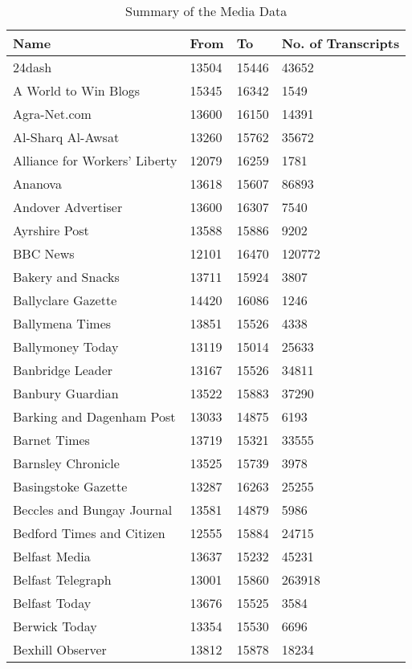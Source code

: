 \begingroup\tiny
\begin{longtable}{p{}p{}p{}p{}}
\caption{Summary of the Media Data} \\ 
  \hline
Name & From & To & No. of Transcripts \\ 
  \hline
24dash & 13504 & 15446 & 43652 \\ 
  A World to Win Blogs & 15345 & 16342 & 1549 \\ 
  Agra-Net.com & 13600 & 16150 & 14391 \\ 
  Al-Sharq Al-Awsat & 13260 & 15762 & 35672 \\ 
  Alliance for Workers' Liberty & 12079 & 16259 & 1781 \\ 
  Ananova & 13618 & 15607 & 86893 \\ 
  Andover Advertiser & 13600 & 16307 & 7540 \\ 
  Ayrshire Post & 13588 & 15886 & 9202 \\ 
  BBC News & 12101 & 16470 & 120772 \\ 
  Bakery and Snacks & 13711 & 15924 & 3807 \\ 
  Ballyclare Gazette & 14420 & 16086 & 1246 \\ 
  Ballymena Times & 13851 & 15526 & 4338 \\ 
  Ballymoney Today & 13119 & 15014 & 25633 \\ 
  Banbridge Leader & 13167 & 15526 & 34811 \\ 
  Banbury Guardian & 13522 & 15883 & 37290 \\ 
  Barking and Dagenham Post & 13033 & 14875 & 6193 \\ 
  Barnet Times & 13719 & 15321 & 33555 \\ 
  Barnsley Chronicle & 13525 & 15739 & 3978 \\ 
  Basingstoke Gazette & 13287 & 16263 & 25255 \\ 
  Beccles and Bungay Journal & 13581 & 14879 & 5986 \\ 
  Bedford Times and Citizen & 12555 & 15884 & 24715 \\ 
  Belfast Media & 13637 & 15232 & 45231 \\ 
  Belfast Telegraph & 13001 & 15860 & 263918 \\ 
  Belfast Today & 13676 & 15525 & 3584 \\ 
  Berwick Today & 13354 & 15530 & 6696 \\ 
  Bexhill Observer & 13812 & 15878 & 18234 \\ 

\end{longtable}
